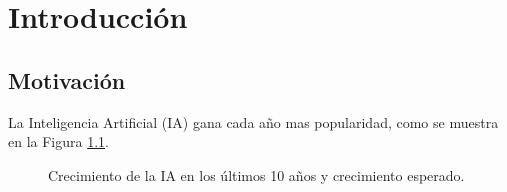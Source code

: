 \chapter{Introducción}

\section{Motivación}

La Inteligencia Artificial (IA) gana cada año mas popularidad, como se muestra en la Figura \ref{fig:ai_grow}.

\begin{figure}[htb]
  \begin{subcaptiongroup}
  \begin{floatrow}
  \end{floatrow}
  \end{subcaptiongroup}
  \caption{Crecimiento de la IA en los últimos 10 años y crecimiento esperado.}%
  \label{fig:ai_grow}%
\end{figure}

